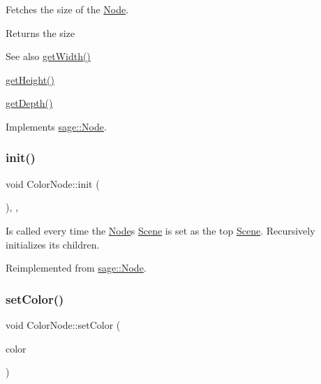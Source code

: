 Fetches the size of the \mbox{\hyperlink{classsage_1_1Node}{Node}}. 

\begin{DoxyReturn}{Returns}
the size 
\end{DoxyReturn}
\begin{DoxySeeAlso}{See also}
\mbox{\hyperlink{classsage_1_1Node_a65163ffabcfe9f482282ea37ead6fc5f}{get\+Width()}} 

\mbox{\hyperlink{classsage_1_1Node_a6af5a8378ac8d2c3490adbc2a03f1247}{get\+Height()}} 

\mbox{\hyperlink{classsage_1_1Node_a5c4c28939c7adf7e4a65dbb02c0cbcd3}{get\+Depth()}} 
\end{DoxySeeAlso}


Implements \mbox{\hyperlink{classsage_1_1Node_ad14a04d08b5261c27d3080f6a5e12836}{sage\+::\+Node}}.

\mbox{\label{classsage_1_1ColorNode_a1a5a055be2cc8d15b38c5c25eb489e94}} 
\subsubsection{\texorpdfstring{init()}{init()}}
{\footnotesize\ttfamily void Color\+Node\+::init (\begin{DoxyParamCaption}{ }\end{DoxyParamCaption})\hspace{0.3cm}{\ttfamily [override]}, {\ttfamily [protected]}, {\ttfamily [virtual]}}



Is called every time the \mbox{\hyperlink{classsage_1_1Node}{Node}}\textquotesingle{}s \mbox{\hyperlink{classsage_1_1Scene}{Scene}} is set as the top \mbox{\hyperlink{classsage_1_1Scene}{Scene}}. Recursively initializes its children. 



Reimplemented from \mbox{\hyperlink{classsage_1_1Node_ab87776adae83149e235e37ed469f4e10}{sage\+::\+Node}}.

\mbox{\label{classsage_1_1ColorNode_a65747783aeea07d997c54b3ef8d212f8}} 
\subsubsection{\texorpdfstring{setColor()}{setColor()}}
{\footnotesize\ttfamily void Color\+Node\+::set\+Color (\begin{DoxyParamCaption}\item[{S\+D\+L\+\_\+\+Color}]{color }\end{DoxyParamCaption})}



